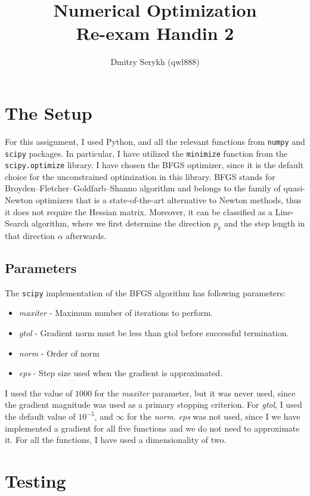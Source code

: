 \documentclass[a4paper]{article}
\title{\vspace{-5cm} Numerical Optimization \\ Re-exam Handin 2}
\author{Dmitry Serykh (qwl888)}
\begin{document}
\maketitle
\section{The Setup}
For this assignment, I used Python, and all the relevant functions from
\texttt{numpy} and \texttt{scipy} packages. In particular, I have utilized the
\texttt{minimize} function from the \texttt{scipy.optimize} library.
I have chosen the BFGS optimizer, since
it is the default choice for the unconstrained optimization in this library. BFGS stands for
Broyden–Fletcher–Goldfarb–Shanno algorithm and belongs to the family
of quasi-Newton optimizers that is a state-of-the-art alternative to Newton
methods, thus it does not require the Hessian matrix. Moreover, it can be
classified as a Line-Search algorithm, where we first determine the direction
$p_k$ and the step length in that direction $\alpha$ afterwards.

\subsection{Parameters}
The \texttt{scipy} implementation of the BFGS algorithm has following
parameters:

\begin{itemize}
\item \emph{maxiter} - Maximum number of iterations to perform.
\item \emph{gtol} - Gradient norm must be less than gtol before successful termination.
\item \emph{norm} - Order of norm
\item \emph{eps} - Step size used when the gradient is approximated.
\end{itemize}
I used the value of $1000$ for the \emph{maxiter} parameter, but it was never
used, since the gradient magnitude was used as a primary stopping criterion.
For \emph{gtol}, I used the default value of
$10^{-5}$, and $\infty$ for the \emph{norm}. \emph{eps} was not used, since I we
have implemented a gradient for all five functions and we do not need to
approximate it. For all the functions, I have used a dimensionality of two.

\section{Testing}
\end{document}
